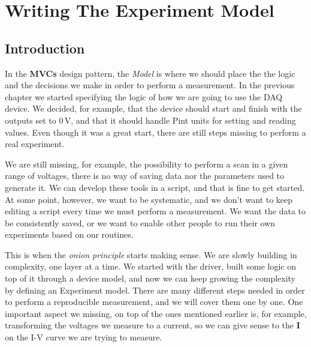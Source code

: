 \chapter{Writing The Experiment Model}\label{chapter:experiment-model}

\section{Introduction}
In the \textbf{MVCs} design pattern, the \emph{Model} is where we should place the the logic and the decisions we make in order to perform a measurement. In the previous chapter we started specifying the logic of how we are going to use the DAQ device. We decided, for example, that the device should start and finish with the outputs set to $0\,\textrm{V}$, and that it should handle Pint units for setting and reading values. Even though it was a great start, there are still steps missing to perform a real experiment. 

We are still missing, for example, the possibility to perform a scan in a given range of voltages, there is no way of saving data nor the parameters used to generate it. We can develop these tools in a script, and that is fine to get started. At some point, however, we want to be systematic, and we don't want to keep editing a script every time we must perform a measurement. We want the data to be consistently saved, or we want to enable other people to run their own experiments based on our routines.

This is when the \emph{onion principle} starts making sense. We are slowly building in complexity, one layer at a time. We started with the driver, built some logic on top of it through a device model, and now we can keep growing the complexity by defining an Experiment model. There are many different steps needed in order to perform a reproducible measurement, and we will cover them one by one. One important aspect we missing, on top of the ones mentioned earlier is, for example, transforming the voltages we measure to a current, so we can give sense to the \textbf{I} on the I-V curve we are trying to measure. 


